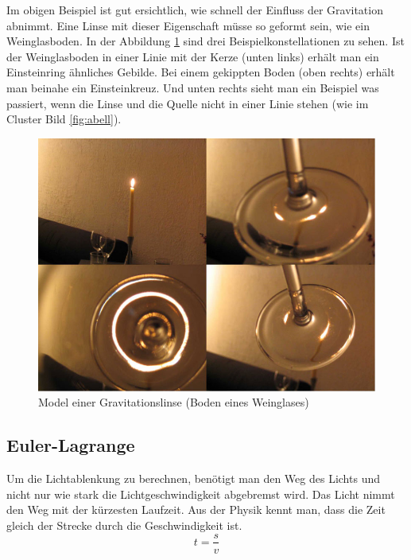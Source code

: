 \begin{refsection}
Im obigen Beispiel ist gut ersichtlich, wie schnell der Einfluss der
Gravitation abnimmt.  Eine Linse mit dieser Eigenschaft müsse so
geformt sein, wie ein Weinglasboden.  In der Abbildung
\ref{fig:ModelGravLinse} sind drei Beispielkonstellationen zu sehen.
Ist der Weinglasboden in einer Linie mit der Kerze (unten links)
erhält man ein Einsteinring ähnliches Gebilde.  Bei einem gekippten
Boden (oben rechts) erhält man beinahe ein Einsteinkreuz.  Und unten
rechts sieht man ein Beispiel was passiert, wenn die Linse und die
Quelle nicht in einer Linie stehen (wie im Cluster Bild
\ref{fig:abell}).

\begin{figure}
  \centering
  \includegraphics[width=\textwidth]{cluster/images/model_grav_lens}
  \caption{Model einer Gravitationslinse (Boden eines Weinglases)
    \cite{standford:ModelGravLens}}
  \label{fig:ModelGravLinse}
\end{figure}

\subsection{Euler-Lagrange}
Um die Lichtablenkung zu berechnen, benötigt man den Weg des Lichts
und nicht nur wie stark die Lichtgeschwindigkeit abgebremst wird.  Das
Licht nimmt den Weg mit der kürzesten Laufzeit.  Aus der Physik kennt
man, dass die Zeit gleich der Strecke durch die Geschwindigkeit ist.
\begin{equation*}
  t = \frac{s}{v}
\end{equation*}


\end{refsection}
